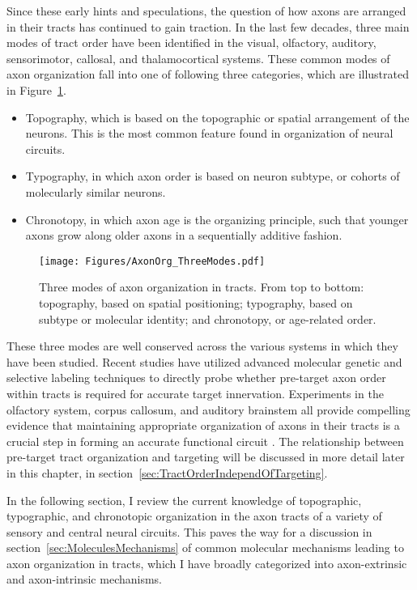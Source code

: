 Since these early hints and speculations, the question of how axons are arranged in their tracts has continued to gain traction.
In the last few decades, three main modes of tract order have been identified in the visual, olfactory, auditory, sensorimotor, callosal, and thalamocortical systems.
These common modes of axon organization fall into one of following three categories, which are illustrated in Figure~\ref{AxonOrgThreeModes}.
\begin{itemize}
\item Topography, which is based on the topographic or spatial arrangement of the neurons.
This is the most common feature found in organization of neural circuits.
\item Typography, in which axon order is based on neuron subtype, or cohorts of molecularly similar neurons.
\item Chronotopy, in which axon age is the organizing principle, such that younger axons grow along older axons in a sequentially additive fashion.
\end{itemize}
\begin{figure}[hbtp]
    \begin{center}
    \texttt{[image: Figures/AxonOrg\_ThreeModes.pdf]}
    \caption[Three modes of axon organization in tracts.]
    {Three modes of axon organization in tracts.
    From top to bottom: topography, based on spatial positioning; typography, based on subtype or molecular identity; and chronotopy, or age-related order.
    \label{AxonOrgThreeModes}}
    \end{center}
\end{figure}
These three modes are well conserved across the various systems in which they have been studied.
Recent studies have utilized advanced molecular genetic and selective labeling techniques to directly probe whether pre-target axon order within tracts is required for accurate target innervation.
Experiments in the olfactory system, corpus callosum, and auditory brainstem all provide compelling evidence that maintaining appropriate organization of axons in their tracts is a crucial step in forming an accurate functional circuit \cite{imai2009pre,zhou2013axon,michalski2013robo3}.
The relationship between pre-target tract organization and targeting will be discussed in more detail later in this chapter, in section~\ref{sec:TractOrderIndependOfTargeting}.

In the following section, I review the current knowledge of topographic, typographic, and chronotopic organization in the axon tracts of a variety of sensory and central neural circuits.
This paves the way for a discussion in section~\ref{sec:MoleculesMechanisms} of common molecular mechanisms leading to axon organization in tracts, which I have broadly categorized into axon-extrinsic and axon-intrinsic mechanisms.

